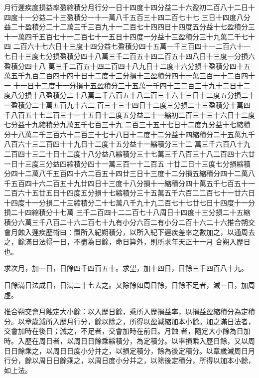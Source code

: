 \begin{pinyinscope}
 月行遲疾度損益率盈縮積分月行分一日十四度十四分益二十六盈初二百八十二日十四度十一分益二十三盈積分一十一萬八千五百三十四二百七十七
 三日十四度八分益二十盈積分二十二萬三千三百九十一二百七十四四日十四度五分益十七盈積分三十一萬四千五百七十一二百七十一五日十四度一分益十三盈積分三十九萬二千七十四
 二百六十七六日十三度十四分益七盈積分四十五萬一千三百四十一二百六十一七日十三度七分損盈積分四十八萬三千二百五十四二百五十四八日十三度一分損六盈積分四十八
 萬三千二百五十四二百四十八九日十二度十六分損十盈積分四十五萬五千九百二百四十四十日十二度十三分損十三盈積分四十一萬三百一十二百四十一
 十一日十二度十一分損十五盈積分三十五萬一千四十三二百三十九十二日十二度八分損十八盈積分二十八萬二千六百五十八二百三十六十三日十二度五分損二十一盈積分二十萬五百九十六二
 百三十三十四日十二度三分損二十三盈積分十萬四千八百五十七二百三十一十五日十二度五分益二十一縮初二百三十三十六日十二度七分益十九縮積分九萬五千七百三十九
 二百三十五十七日十二度九分益十七縮積分十八萬二千三百六十二百三十七十八日十二度十二分益十四縮積分二十五萬九千八百六十三二百四十十九日十二度十五分益十一縮積分三十二
 萬三千六百八十九二百四十三二十日十二度十八分益八縮積分三十七萬三千八百三十八二百四十六廿一日十三度三分益四縮積分四十一萬三百一十二百五
 十廿二日十三度七分損縮積分四十二萬八千五百四十六二百五十四廿三日十三度十二分損五縮積分四十二萬八千五百四十六二百五十九廿四日十三度十八分損十一縮積分四十萬五千七百五十一
 二百六十五廿五日十四度五分損十七縮積分三十五萬五千六百二二百七十一廿六日十四度十一分損二十三縮積分二十七萬八千九十九二百七十七廿七日十四度十一分損二十四縮積分十七萬
 三千二百四十二二百七十八周日十四度十三分損二十五縮積分六萬三千八百二十六二百七十九有小分六百二有小分二百十六二十六推合朔交會月蝕入遲疾歷術曰：置所入紀朔積分，以所入紀下遲疾差率之數加之，以通周去之，餘滿日法得一日，不盡為日餘，命日算外，則所求年天正十一月
 合朔入歷日也。



 求次月，加一日，日餘四千四百五十。求望，加十四日，日餘三千四百八十九。



 日餘滿日法成日，日滿二十七去之。又除餘如周日餘，日餘不足者，減一日，加周虛。



 推合朔交會月蝕定大小餘：以入歷日餘，乘所入歷損益率，以損益盈縮積分為定積分。以章歲減所入歷月行分，餘以除之，所得以盈減縮加本小餘。加之滿日法者，交會加時在後日；減之，不足者，交會加時在前日。月蝕
 者，隨定大小餘為日加時。入歷在周日者，以周日日餘乘縮積分，為定積分。以率損乘入歷日餘，又以周日日餘乘之，以周日日度小分并之，以損定積分，餘為後定積分。以章歲減周日月行分，餘以周日日餘乘之，以周日度小分并之，以除後定積分，所得以加本小餘，如上法。




\end{pinyinscope}
